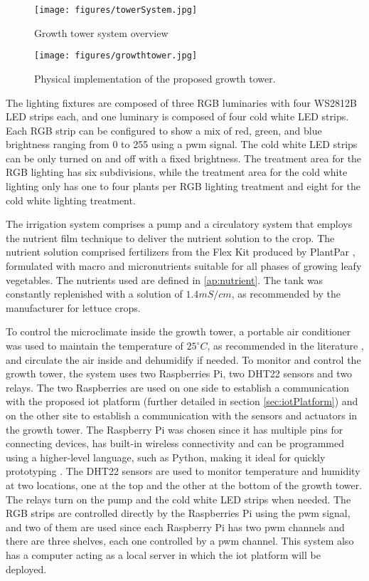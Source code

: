 \documentclass[preprint, review, 12pt]{elsarticle}
\begin{document}
\begin{figure}[htbp]
    \centering
    \texttt{[image: figures/towerSystem.jpg]}
    \caption{Growth tower system overview}
    \label{fig:growthTowerOverview}
\end{figure}

\begin{figure}[htbp]
    \centering
    \texttt{[image: figures/growthtower.jpg]}
    \caption{Physical implementation of the proposed growth tower.}
    \label{fig:growthTowerPhysical}
\end{figure}

The lighting fixtures are composed of three RGB luminaries with four WS2812B LED \cite{worldsemi} strips each, and one luminary is composed of four cold white LED strips. Each RGB strip can be configured to show a mix of red, green, and blue brightness ranging from 0 to 255 using a \gls{pwm} signal. The cold white LED strips can be only turned on and off with a fixed brightness. The treatment area for the RGB lighting has six subdivisions, while the treatment area for the cold white lighting only has one to four plants per RGB lighting treatment and eight for the cold white lighting treatment. 

The irrigation system comprises a pump and a circulatory system that employs the nutrient film technique to deliver the nutrient solution to the crop. The nutrient solution comprised fertilizers from the Flex Kit produced by PlantPar \cite{PlantPar}, formulated with macro and micronutrients suitable for all phases of growing leafy vegetables. The nutrients used are defined in \ref{ap:nutrient}. The tank was constantly replenished with a solution of $1.4 mS/cm$, as recommended by the manufacturer for lettuce crops.

To control the microclimate inside the growth tower, a portable air conditioner was used to maintain the temperature of $25^{\circ}C$, as recommended in the literature \cite{kozai2020}, and circulate the air inside and dehumidify if needed. To monitor and control the growth tower, the system uses two Raspberries Pi, two DHT22 \cite{aosongelectronicsco} sensors and two relays. The two Raspberries are used on one side to establish a communication with the proposed \gls{iot} platform (further detailed in section \ref{sec:iotPlatform}) and on the other site to establish a communication with the sensors and actuators in the growth tower. The Raspberry Pi was chosen since it has multiple pins for connecting devices, has built-in wireless connectivity and can be programmed using a higher-level language, such as Python, making it ideal for quickly prototyping \cite{mathe2024}. The DHT22 sensors are used to monitor temperature and humidity at two locations, one at the top and the other at the bottom of the growth tower. The relays turn on the pump and the cold white LED strips when needed. The RGB strips are controlled directly by the Raspberries Pi using the \gls{pwm} signal, and two of them are used since each Raspberry Pi has two \gls{pwm} channels and there are three shelves, each one controlled by a \gls{pwm} channel. This system also has a computer acting as a local server in which the \gls{iot} platform will be deployed.  
\end{document}
